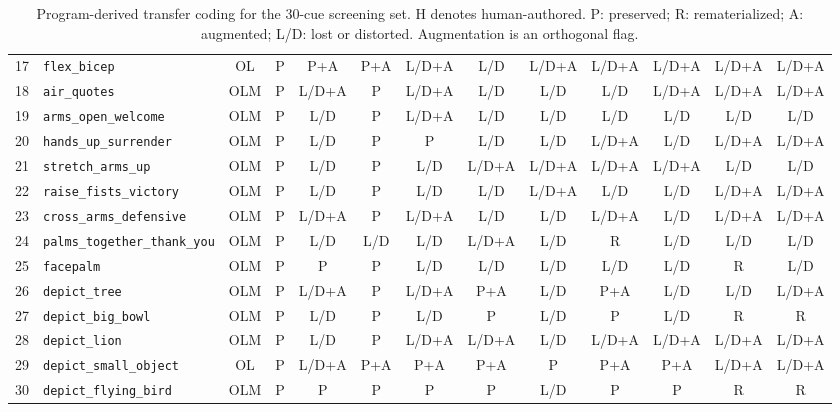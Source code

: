 \begin{table}[t]
\begin{tabular}{@{}r l c cc cc cc cc cc@{}}
17 & \texttt{flex\_bicep} & OL & P & P+A & P+A & L/D+A & L/D & L/D+A & L/D+A & L/D+A & L/D+A & L/D+A \\
18 & \texttt{air\_quotes} & OLM & P & L/D+A & P & L/D+A & L/D & L/D & L/D & L/D+A & L/D+A & L/D+A \\
19 & \texttt{arms\_open\_welcome} & OLM & P & L/D & P & L/D+A & L/D & L/D & L/D & L/D & L/D & L/D \\
20 & \texttt{hands\_up\_surrender} & OLM & P & L/D & P & P & L/D & L/D & L/D+A & L/D & L/D+A & L/D+A \\
21 & \texttt{stretch\_arms\_up} & OLM & P & L/D & P & L/D & L/D+A & L/D+A & L/D+A & L/D+A & L/D & L/D \\
22 & \texttt{raise\_fists\_victory} & OLM & P & L/D & P & L/D & L/D & L/D+A & L/D & L/D & L/D+A & L/D+A \\
23 & \texttt{cross\_arms\_defensive} & OLM & P & L/D+A & P & L/D+A & L/D & L/D & L/D+A & L/D & L/D+A & L/D+A \\
24 & \texttt{palms\_together\_thank\_you} & OLM & P & L/D & L/D & L/D & L/D+A & L/D & R & L/D & L/D & L/D \\
25 & \texttt{facepalm} & OLM & P & P & P & L/D & L/D & L/D & L/D & L/D & R & L/D \\
26 & \texttt{depict\_tree} & OLM & P & L/D+A & P & L/D+A & P+A & L/D & P+A & L/D & L/D & L/D+A \\
27 & \texttt{depict\_big\_bowl} & OLM & P & L/D & P & L/D & P & L/D & P & L/D & R & R \\
28 & \texttt{depict\_lion} & OLM & P & L/D & P & L/D+A & L/D+A & L/D & L/D+A & L/D+A & L/D+A & L/D+A \\
29 & \texttt{depict\_small\_object} & OL & P & L/D+A & P+A & P+A & P+A & P & P+A & P+A & L/D+A & L/D+A \\
30 & \texttt{depict\_flying\_bird} & OLM & P & P & P & P & P & L/D & P & P & R & R \\
\bottomrule
\end{tabular}
\caption{Program-derived transfer coding for the 30-cue screening set. H denotes human-authored. P: preserved; R: rematerialized; A: augmented; L/D: lost or distorted. Augmentation is an orthogonal flag.}
\label{tab:transfer-outcomes-30}
\end{table}
